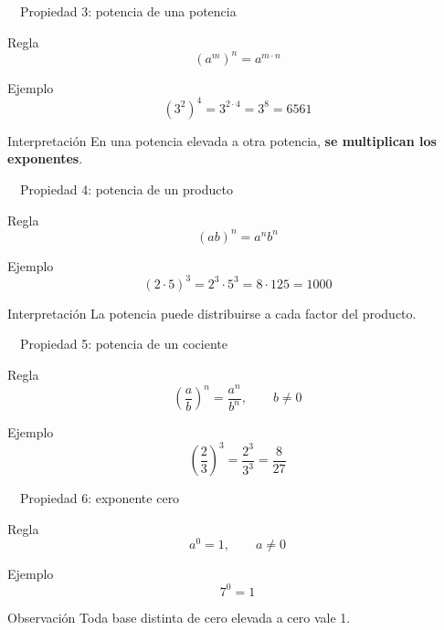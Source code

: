 \documentclass[aspectratio=169,10pt,handout]{beamer}
\newcommand{\destacar}[1]{\textcolor{USTBlueDark}{\textbf{#1}}}
\newcommand{\iconoDesarrollo}{\faBrain}
\begin{document}
	\begin{frame}{\iconoDesarrollo\ \ Propiedad 3: potencia de una potencia}
		\begin{block}{Regla}
			\[
			(a^m)^n = a^{m\cdot n}
			\]
		\end{block}
		
		\begin{exampleblock}{Ejemplo}
			\[
			(3^2)^4 = 3^{2\cdot4}=3^8=6561
			\]
		\end{exampleblock}
		
		\begin{alertblock}{Interpretación}
			En una potencia elevada a otra potencia, \destacar{se multiplican los exponentes}.
		\end{alertblock}
	\end{frame}
	
	\begin{frame}{\iconoDesarrollo\ \ Propiedad 4: potencia de un producto}
		\begin{block}{Regla}
			\[
			(ab)^n = a^n b^n
			\]
		\end{block}
		
		\begin{exampleblock}{Ejemplo}
			\[
			(2\cdot5)^3 = 2^3\cdot5^3 = 8\cdot125 = 1000
			\]
		\end{exampleblock}
		
		\begin{alertblock}{Interpretación}
			La potencia puede distribuirse a cada factor del producto.
		\end{alertblock}
	\end{frame}
	
	\begin{frame}{\iconoDesarrollo\ \ Propiedad 5: potencia de un cociente}
		\begin{block}{Regla}
			\[
			\left(\frac{a}{b}\right)^n = \frac{a^n}{b^n}, \qquad b\neq 0
			\]
		\end{block}
		
		\begin{exampleblock}{Ejemplo}
			\[
			\left(\frac{2}{3}\right)^3 = \frac{2^3}{3^3}=\frac{8}{27}
			\]
		\end{exampleblock}
	\end{frame}
	
	\begin{frame}{\iconoDesarrollo\ \ Propiedad 6: exponente cero}
		\begin{block}{Regla}
			\[
			a^0=1,\qquad a\neq0
			\]
		\end{block}
		
		\begin{exampleblock}{Ejemplo}
			\[
			7^0=1
			\]
		\end{exampleblock}
		
		\begin{alertblock}{Observación}
			Toda base distinta de cero elevada a cero vale 1.
		\end{alertblock}
	\end{frame}
	
\end{document}
